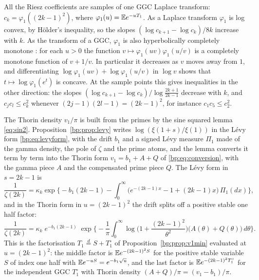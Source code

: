 \begin{remark}\label{ri:rem:hcm}
All the Riesz coefficients are samples of one GGC Laplace transform: $c_k=\varphi_1((2k-1)^2)$, where $\varphi_1(u)=\mathbb{E} e^{-uT_1}$. As a Laplace transform $\varphi_1$ is log convex, by H\"older's inequality, so the slopes $(\log c_{k+1}-\log c_k)/8k$ increase with $k$. As the transform of a GGC, $\varphi_1$ is also hyperbolically completely monotone \cite[Theorem 6.1.1]{Bondesson}: for each $u>0$ the function $v\mapsto\varphi_1(uv)\varphi_1(u/v)$ is a completely monotone function of $v+1/v$. In particular it decreases as $v$ moves away from $1$, and differentiating $\log\varphi_1(uv)+\log\varphi_1(u/v)$ in $\log v$ shows that $t\mapsto\log\varphi_1(e^t)$ is concave. At the sample points this gives inequalities in the other direction: the slopes $(\log c_{k+1}-\log c_k)/\log\frac{2k+1}{2k-1}$ decrease with $k$, and $c_jc_l\le c_k^2$ whenever $(2j-1)(2l-1)=(2k-1)^2$, for instance $c_1c_5\le c_2^2$.
\end{remark}

The Thorin density $v_1/\pi$ is built from the primes by the sine squared lemma \eqref{eq:sin2}. Proposition~\ref{bp:prop:levy} writes $\log(\xi(1+s)/\xi(1))$ in the L\'evy form \eqref{bp:eq:levyform}, with the drift $b_1$ and a signed L\'evy measure $\Pi_1$ made of the gamma density, the pole of $\zeta$ and the prime atoms, and the lemma converts it term by term into the Thorin form $v_1=b_1+A+Q$ of \eqref{bp:eq:conversion}, with the gamma piece $A$ and the compensated prime piece $Q$. The L\'evy form in $s=2k-1$ is
\[
\frac1{\zeta(2k)}=\kappa_k\exp\Big\{-b_1(2k-1)-\int_0^\infty\big(e^{-(2k-1)x}-1+(2k-1)x\big)\,\Pi_1(dx)\Big\},
\]
and in the Thorin form in $u=(2k-1)^2$ the drift splits off a positive stable one half factor:
\begin{equation}\label{ri:eq:factor}
\frac1{\zeta(2k)}=\kappa_k\;e^{-b_1(2k-1)}\;\exp\Big\{-\frac1\pi\int_0^\infty\log\Big(1+\frac{(2k-1)^2}{\theta^2}\Big)\big(A(\theta)+Q(\theta)\big)\,d\theta\Big\}.
\end{equation}
This is the factorisation $T_1\stackrel d=S+T_1^\circ$ of Proposition~\ref{bp:prop:v1min} evaluated at $u=(2k-1)^2$: the middle factor is $\mathbb{E} e^{-(2k-1)^2S}$ for the positive stable variable $S$ of index one half with $\mathbb{E} e^{-uS}=e^{-b_1\sqrt u}$, and the last factor is $\mathbb{E} e^{-(2k-1)^2T_1^\circ}$ for the independent GGC $T_1^\circ$ with Thorin density $(A+Q)/\pi=(v_1-b_1)/\pi$.

